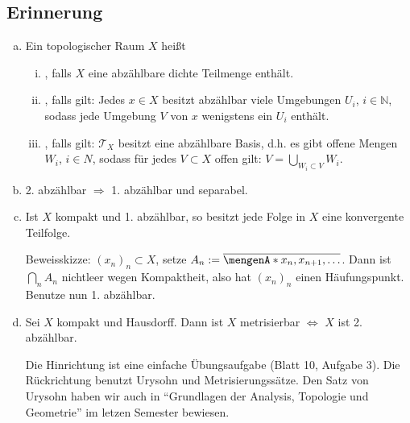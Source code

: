 \subsection[Erinnerung: separabel, 1. abzählbar, 2. abzählbar]{Erinnerung} %
\label{sub:511}
\begin{enumerate}[(a)]
	\item Ein topologischer Raum $X$ heißt
	\begin{enumerate}[(i)]
		\item {}, falls $X$ eine abzählbare dichte Teilmenge enthält.
		\item {}, falls gilt: Jedes $x \in X$ besitzt abzählbar viele Umgebungen $U_i$, $i \in \mathds{N}$, sodass jede Umgebung $V$ von $x$ wenigstens ein
		$U_i$ enthält.  
		\item {}, falls gilt: $\mathcal{T}_X$ besitzt eine abzählbare Basis, d.h. es gibt offene Mengen $W_i$, $i \in N$, sodass für jedes $V \subset X$ 
		offen gilt: $V= \bigcup_{W_i \subset V} W_i$.
	\end{enumerate}
	\item 2. abzählbar $\Rightarrow $ 1. abzählbar und separabel.
	\item Ist $X$ kompakt und 1. abzählbar, so besitzt jede Folge in $X$ eine konvergente Teilfolge.
	
	Beweisskizze: $(x_n)_n \subset X$, setze $A_n := \overline{\set{x_n, x_{n+1}, \ldots }}$. Dann ist $\bigcap_n A_n$ nichtleer wegen Kompaktheit, also
	hat $(x_n)_n$ einen Häufungspunkt. Benutze nun 1. abzählbar.
	\item Sei $X$ kompakt und Hausdorff. Dann ist $X$ metrisierbar $\iff$ $X$ ist 2. abzählbar.
	
	Die Hinrichtung ist eine einfache Übungsaufgabe (Blatt 10, Aufgabe 3). Die Rückrichtung benutzt Urysohn und Metrisierungssätze. Den Satz von Urysohn haben wir auch in 
	\enquote{Grundlagen der Analysis, Topologie und Geometrie} im letzen Semester bewiesen.
\end{enumerate}

